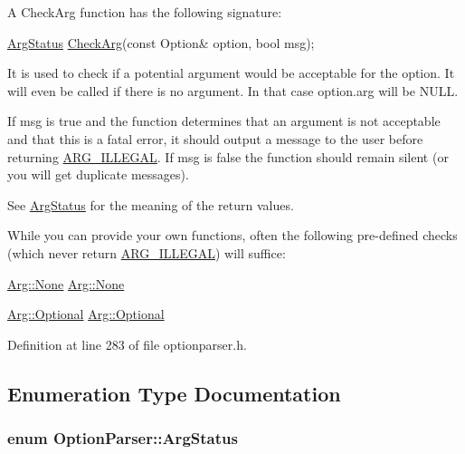 A Check\-Arg function has the following signature\-: 
\begin{DoxyCode}
\hyperlink{namespace_option_parser_ad237d47d58c66dea8dcf4f53ac11a6e4}{ArgStatus} \hyperlink{namespace_option_parser_aee9955553cc70fd9fd41849622680c6a}{CheckArg}(\textcolor{keyword}{const} Option& option, \textcolor{keywordtype}{bool} msg); 
\end{DoxyCode}


It is used to check if a potential argument would be acceptable for the option. It will even be called if there is no argument. In that case {\ttfamily option.\-arg} will be {\ttfamily N\-U\-L\-L}.

If {\ttfamily msg} is {\ttfamily true} and the function determines that an argument is not acceptable and that this is a fatal error, it should output a message to the user before returning \hyperlink{namespace_option_parser_ad237d47d58c66dea8dcf4f53ac11a6e4a6ea016ff6334ed0d2ec885e96a76c472}{A\-R\-G\-\_\-\-I\-L\-L\-E\-G\-A\-L}. If {\ttfamily msg} is {\ttfamily false} the function should remain silent (or you will get duplicate messages).

See \hyperlink{namespace_option_parser_ad237d47d58c66dea8dcf4f53ac11a6e4}{Arg\-Status} for the meaning of the return values.

While you can provide your own functions, often the following pre-\/defined checks (which never return \hyperlink{namespace_option_parser_ad237d47d58c66dea8dcf4f53ac11a6e4a6ea016ff6334ed0d2ec885e96a76c472}{A\-R\-G\-\_\-\-I\-L\-L\-E\-G\-A\-L}) will suffice\-:

\begin{DoxyItemize}
\item {\ttfamily \hyperlink{struct_option_parser_1_1_arg_afd9e5e7362e4accc619fe7dee7098956}{Arg\-::\-None}}  \hyperlink{struct_option_parser_1_1_arg_afd9e5e7362e4accc619fe7dee7098956}{Arg\-::\-None} \item {\ttfamily \hyperlink{struct_option_parser_1_1_arg_a3fcea82be66b4aff1971cbab6deabdf1}{Arg\-::\-Optional}}  \hyperlink{struct_option_parser_1_1_arg_a3fcea82be66b4aff1971cbab6deabdf1}{Arg\-::\-Optional} \end{DoxyItemize}


Definition at line 283 of file optionparser.\-h.



\subsection{Enumeration Type Documentation}
\hypertarget{namespace_option_parser_ad237d47d58c66dea8dcf4f53ac11a6e4}{
\subsubsection[{Arg\-Status}]{\setlength{\rightskip}{0pt plus 5cm}enum {\bf Option\-Parser\-::\-Arg\-Status}}}\label{namespace_option_parser_ad237d47d58c66dea8dcf4f53ac11a6e4}


